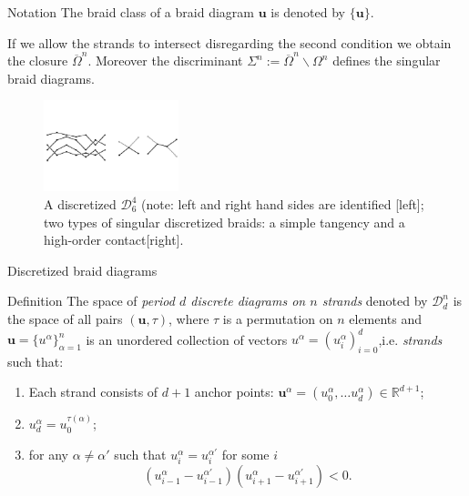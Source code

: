 \documentclass[9pt, english]{beamer}
\theoremstyle{definition}
\newcommand{\simbolovettore}[1]{{\boldsymbol{#1}}}
\newcommand{\vu}{\simbolovettore{u}}
\newcommand{\R}{\mathbb{R}}                     %
\begin{document}
\begin{frame}
    \begin{block}{Notation}
            The braid class of a braid diagram $\vu$ is denoted by
            $\{\vu\}$.\pause

            If we allow the strands to intersect disregarding the
            second condition we obtain the closure
            $\overline \Omega^n$. Moreover the discriminant $\Sigma^n:= \overline \Omega^n \backslash \Omega^n$
            defines the \alert{singular braid diagrams}.\pause
    \end{block}
        \begin{figure}\label{fig:discretized}
            \includegraphics[width=0.35\textwidth]{images/Fig2Kyoto2.pdf}\caption{A discretized $\mathcal{D}_6^4$ (note: left and right
            hand sides are identified [left]; two types of singular discretized braids: a simple
            tangency and a high-order contact[right].}
        \end{figure}
\end{frame}
\begin{frame}{Discretized braid diagrams}
    \begin{block}{Definition}
        The space of {\em period $d$ discrete diagrams on $n$ strands\/}
        denoted by $\mathcal{D}_d^n$ is the space of all pairs $(\vu,
        \tau)$, \pause where $\tau$ is a permutation on $n$ elements \pause and
        $\vu=\{u^\alpha\}_{\alpha=1}^n$ is an unordered collection of
        vectors $u^\alpha=(u_i^\alpha)_{i=0}^d$,\pause i.e. {\em strands\/}
        such that:
        \begin{enumerate}
        \item Each strand consists of $d+1$ anchor points: $\vu^\alpha=(u_0^\alpha, \dots u_d^\alpha)\in
        \R^{d+1}$;\pause
        \item {} $u_d^\alpha= u_0^{\tau(\alpha)}$;\pause
        \item {} for any $\alpha\neq \alpha'$ such
        that $u_i^\alpha=u_i^{\alpha'}$ for some $i$
        \[
        (u_{i-1}^\alpha - u_{i-1}^{\alpha'})(u_{i+1}^\alpha-
        u_{i+1}^{\alpha'})<0.
        \]
        \end{enumerate}
        \end{block}
\end{frame}
\end{document}
